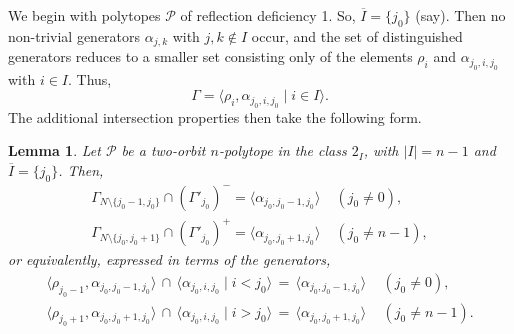 \documentclass[12pt]{article}
\renewcommand{\bar}{\overline}
\renewcommand{\>}{\rangle}
\newtheorem{lemma}[theorem]{Lemma}
\theoremstyle{definition}\newtheorem{definition}{Definition}[section]
\begin{document}
We begin with polytopes $\mathcal{P}$ of reflection deficiency 1. So, $\bar{I}=\{j_0\}$ (say). Then no non-trivial generators $\alpha_{j,k}$ with $j,k\notin I$ occur, and the set of distinguished generators reduces to a smaller set consisting only of the elements $\rho_i$ and $\alpha_{j_{0},i,j_{0}}$ with $i\in I$. Thus, 
\begin{equation}
\label{gengamsmall}
\Gamma = \langle \rho_i,\alpha_{j_{0},i,j_{0}} \mid i \in I\rangle.
\end{equation}
The additional intersection properties then take the following form.

\begin{lemma}
\label{intrefdef}
Let $\mathcal{P}$ be a two-orbit $n$-polytope in the class $2_I$, with $|I|=n-1$ and $\bar{I}=\{j_0\}$. Then, 
\begin{equation}
\label{intrefdef1one}
\begin{array}{cl}
\Gamma_{N\setminus\{j_{0}-1,j_{0}\}} \cap (\Gamma'_{j_0})^{-} = 
\langle\alpha_{j_{0},j_{0}-1,j_{0}}\rangle
&\;(j_{0}\neq 0),\\[.05in]
\Gamma_{N\setminus\{j_{0},j_{0}+1\}} \cap (\Gamma'_{j_0})^+ = 
\langle\alpha_{j_{0},j_{0}+1,j_{0}}\rangle
&\;(j_{0}\neq n-1), 
\end{array}
\end{equation}
or equivalently, expressed in terms of the generators, 
\begin{equation}
\label{intrefdef1two}
\begin{array}{l}
\langle\rho_{{j_0}-1},\alpha_{j_{0},j_{0}-1,j_{0}}\rangle 
\,\cap\, \langle\alpha_{j_{0},i,j_{0}}\mid i<j_{0}\rangle
\,=\, \langle\alpha_{j_{0},j_{0}-1,j_{0}}\rangle
\quad\, (j_{0}\neq 0),\\[.05in]
\langle\rho_{{j_0}+1},\alpha_{j_{0},j_{0}+1,j_{0}}\rangle 
\,\cap\, \langle\alpha_{j_{0},i,j_{0}}\mid i>j_{0}\rangle
\,=\, \langle\alpha_{j_{0},j_{0}+1,j_{0}}\rangle
\quad\, (j_{0}\neq n-1).
\end{array}
\end{equation}
\end{lemma}
\end{document}
